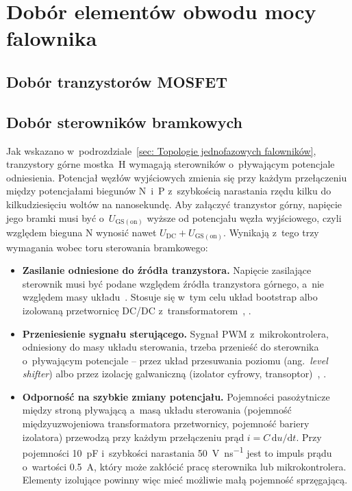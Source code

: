 \chapter{Dobór elementów obwodu mocy falownika}
\label{chap: Dobór elementów obwodu mocy falownika}

\section{Dobór tranzystorów MOSFET}
\label{sec: Dobór tranzystorów MOSFET}

\section{Dobór sterowników bramkowych}
\label{sec: Dobór sterowników bramkowych}

Jak wskazano w~podrozdziale~\ref{sec: Topologie jednofazowych falowników},
tranzystory górne mostka~H wymagają sterowników o~pływającym potencjale
odniesienia. Potencjał węzłów wyjściowych zmienia się przy każdym przełączeniu
między potencjałami biegunów N~i~P z~szybkością narastania rzędu kilku do
kilkudziesięciu woltów na nanosekundę. Aby załączyć tranzystor górny,
napięcie jego bramki musi być o~$U_\mathrm{GS(on)}$ wyższe od potencjału węzła
wyjściowego, czyli względem bieguna N wynosić nawet
$U_\mathrm{DC} + U_\mathrm{GS(on)}$. Wynikają z~tego trzy wymagania wobec
toru sterowania bramkowego:
\begin{itemize}
  \item \textbf{Zasilanie odniesione do źródła tranzystora.} Napięcie
    zasilające sterownik musi być podane względem źródła tranzystora górnego,
    a~nie względem masy układu~\cite[s.~29, 142]{mohan2012}. Stosuje się
    w~tym celu układ bootstrap albo izolowaną przetwornicę DC/DC
    z~transformatorem~\cite[s.~15]{instrukcja}, \cite[rozdz.~5, 7]{balogh2018}.
  \item \textbf{Przeniesienie sygnału sterującego.} Sygnał PWM z~mikrokontrolera,
    odniesiony do masy układu sterowania, trzeba przenieść do sterownika
    o~pływającym potencjale -- przez układ przesuwania poziomu
    (ang.~\textit{level shifter}) albo przez izolację galwaniczną (izolator
    cyfrowy, transoptor)~\cite[s.~29]{mohan2012}, \cite[rozdz.~5]{balogh2018}.
  \item \textbf{Odporność na szybkie zmiany potencjału.} Pojemności
    pasożytnicze między stroną pływającą a~masą układu sterowania (pojemność
    międzyuzwojeniowa transformatora przetwornicy, pojemność bariery
    izolatora) przewodzą przy każdym przełączeniu prąd
    $i = C\,\mathrm{d}u/\mathrm{d}t$. Przy pojemności \SI{10}{\pico\farad}
    i~szybkości narastania \SI{50}{\volt\per\nano\second} jest to impuls
    prądu o~wartości \SI{0,5}{\ampere}, który może zakłócić pracę sterownika
    lub mikrokontrolera. Elementy izolujące powinny więc mieć możliwie małą
    pojemność sprzęgającą.
\end{itemize}

